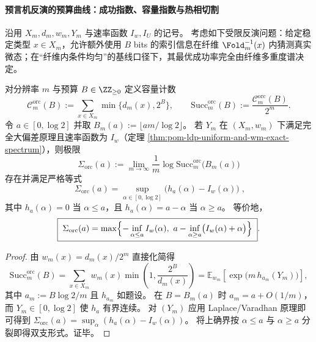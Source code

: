 

\paragraph{预言机反演的预算曲线：成功指数、容量指数与热相切割}
沿用 \(X_m,d_m,w_m,Y_m\) 与速率函数 \(I_w,I_U\) 的记号。
考虑如下受限反演问题：给定稳定类型 \(x\in X_m\)，允许额外使用 \(B\) bits 的索引信息在纤维 \(\Fold_m^{-1}(x)\) 内猜测真实微态；在“纤维内条件均匀”的基线口径下，其最优成功率完全由纤维多重度谱决定。



\begin{theorem}\label{thm:pom-oracle-success-variational-laplace}
对分辨率 \(m\) 与预算 \(B\in\ZZ_{\ge 0}\) 定义容量计数
\[
\mathcal{C}^{\mathrm{orc}}_m(B):=\sum_{x\in X_m}\min\{d_m(x),2^B\},
\qquad
\mathrm{Succ}^{\mathrm{orc}}_m(B):=\frac{\mathcal{C}^{\mathrm{orc}}_m(B)}{2^m}.
\]
令 \(a\in[0,\log 2]\) 并取 \(B_m(a):=\lfloor a m/\log 2\rfloor\)。
若 \(Y_m\) 在 \((X_m,w_m)\) 下满足完全大偏差原理且速率函数为 \(I_w\)（定理 \ref{thm:pom-ldp-uniform-and-wm-exact-spectrum}），则极限
\[
\Sigma_{\mathrm{orc}}(a):=\lim_{m\to\infty}\frac{1}{m}\log \mathrm{Succ}^{\mathrm{orc}}_m\bigl(B_m(a)\bigr)
\]
存在并满足严格等式
\[
\boxed{\;
\Sigma_{\mathrm{orc}}(a)=\sup_{\alpha\in[0,\log 2]}\bigl(h_a(\alpha)-I_w(\alpha)\bigr)\;},
\]
其中 \(h_a(\alpha)=0\) 当 \(\alpha\le a\)，且 \(h_a(\alpha)=a-\alpha\) 当 \(\alpha\ge a\)。
等价地，
\[
\boxed{\;
\Sigma_{\mathrm{orc}}(a)=
\max\Bigl\{-\inf_{\alpha\le a}I_w(\alpha),\ a-\inf_{\alpha\ge a}\bigl(I_w(\alpha)+\alpha\bigr)\Bigr\}\; } .
\]
\end{theorem}
\begin{proof}
由 \(w_m(x)=d_m(x)/2^m\) 直接化简得
\[
\mathrm{Succ}^{\mathrm{orc}}_m(B)
=\sum_{x\in X_m}w_m(x)\min\!\left(1,\frac{2^B}{d_m(x)}\right)
=\mathbb{E}_{w_m}\!\left[\exp\!\bigl(m\,h_{a_m}(Y_m)\bigr)\right],
\]
其中 \(a_m:=B\log 2/m\) 且 \(h_{a_m}\) 如题设。
在 \(B=B_m(a)\) 时 \(a_m=a+O(1/m)\)，而 \(Y_m\in[0,\log 2]\) 使 \(h_a\) 有界连续。
对 \((Y_m)\) 应用 Laplace/Varadhan 原理即可得到
\(
\Sigma_{\mathrm{orc}}(a)=\sup_\alpha(h_a(\alpha)-I_w(\alpha))
\)。
将上确界按 \(\alpha\le a\) 与 \(\alpha\ge a\) 分裂即得双支形式。证毕。
\end{proof}

